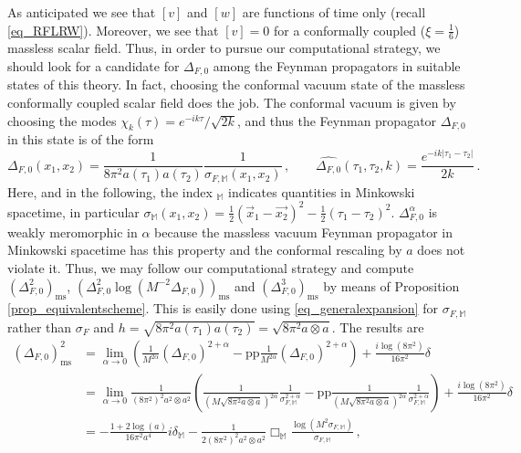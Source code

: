 \documentclass[a4paper,10pt,twoside]{article}
\numberwithin{equation}{section}
\newcounter{and}
\def\bbM{\mathbb{M}}
\def\pp{\mathrm{pp}}
\def\ms{\mathrm{ms}}
\theoremstyle{plain}
\theoremstyle{definition}
\begin{document}
As anticipated we see that $[v]$ and $[w]$ are functions of time only (recall \eqref{eq_RFLRW}). Moreover, we see that $[v]=0$ for a conformally coupled ($\xi=\frac16$) massless scalar field. Thus, in order to pursue our computational strategy, we should look for a candidate for $\Delta_{F,0}$ among the Feynman propagators in suitable states of this theory. In fact, choosing the conformal vacuum state of the massless conformally coupled scalar field does the job. The conformal vacuum is given by choosing the modes $\chi_k(\tau)=e^{-ik\tau}/\sqrt{2k}$, and thus the Feynman propagator $\Delta_{F,0}$ in this state is of the form
\begin{equation}\label{eq_propagatorconformal}
\Delta_{F,0}(x_1,x_2)=\frac{1}{8\pi^2 a(\tau_1)a(\tau_2)}\frac{1}{\sigma_{F,\bbM}(x_1,x_2)}\,,\qquad \widehat{\Delta_{F,0}}(\tau_1,\tau_2,k)=\frac{e^{-ik|\tau_1-\tau_2|}}{2k}\,.
\end{equation}
Here, and in the following, the index $_{\bbM}$ indicates quantities in Minkowski spacetime, in particular $\sigma_{\bbM}(x_1,x_2)=\frac12(\vec{x}_1-\vec{x_2})^2-\frac12(\tau_1-\tau_2)^2$. $\Delta^\alpha_{F,0}$ is weakly meromorphic in $\alpha$ because the massless vacuum Feynman propagator in Minkowski spacetime has this property and the conformal rescaling by $a$ does not violate it. Thus, we may follow our computational strategy and compute $\left(\Delta^2_{F,0}\right)_\ms$, $\left(\Delta^2_{F,0}\log \left(M^{-2} \Delta_{F,0}\right)\right)_\ms$ and  $\left(\Delta^3_{F,0}\right)_\ms$ by means of Proposition \ref{prop_equivalentscheme}. This is easily done using \eqref{eq_generalexpansion} for $\sigma_{F,\bbM}$ rather than $\sigma_F$ and $h=\sqrt{8\pi^2 a(\tau_1)a(\tau_2)}=\sqrt{8\pi^2 a\otimes a}$. The results are
\begin{align*}
(\Delta_{F,0})^2_\text{ms}&= \lim_{\alpha\to 0}\left(\frac{1}{M^{2\alpha}}(\Delta_{F,0})^{2+\alpha}-\pp\frac{1}{M^{2\alpha}}(\Delta_{F,0})^{2+\alpha}\right)+\frac{i\log(8\pi^2)}{16\pi^2}\delta\\
&= \lim_{\alpha\to 0}\frac{1}{(8\pi^2)^2a^2\otimes a^2}\left(\frac{1}{(M\sqrt{8\pi^2 a\otimes a})^{2\alpha}}\frac{1}{\sigma_{F,\bbM}^{2+\alpha}}-\pp \frac{1}{(M\sqrt{8\pi^2 a\otimes a})^{2\alpha}}\frac{1}{\sigma_{F,\bbM}^{2+\alpha}}\right)+\frac{i\log(8\pi^2)}{16\pi^2}\delta\\
&=-\frac{1+2\log (a)}{16\pi^2 a^4}i\delta_\bbM-\frac{1}{2(8\pi^2)^2 a^2\otimes a^2}\Box_{\bbM}\frac{\log\left(M^2\sigma_{F,\bbM}\right)}{\sigma_{F,\bbM}}\,,
\end{align*}
\end{document}
